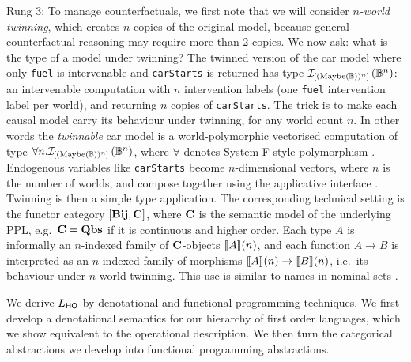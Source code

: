 \documentclass[11pt,a4paper]{article}
\begin{document}
Rung 3: To manage counterfactuals, we first note that we will consider \emph{$n$-world twinning}, which creates $n$ copies of the original model, because general counterfactual reasoning may require more than 2 copies. We now ask: what is the type of a model under twinning? The twinned version of the car model where only \texttt{fuel} is intervenable and \texttt{carStarts} is returned has type $\mathcal{I}_{[(\mathrm{Maybe}({\mathbb{B}}))^n]}\left(\mathbb{B}^n\right)$: an intervenable computation with $n$ intervention labels (one \texttt{fuel} intervention label per world), and returning $n$ copies of \texttt{carStarts}. The trick is to make each causal model carry its behaviour under twinning, for any world count $n$. In other words the \emph{twinnable} car model is a world-polymorphic vectorised computation of type $\forall n. \mathcal{I}_{[(\mathrm{Maybe}({\mathbb{B}}))^n]}\left(\mathbb{B}^n\right)$, where $\forall$ denotes System-F-style polymorphism \cite{reynolds74_system_f,Girard1972InterpretationFE}. Endogenous variables like \texttt{carStarts} become $n$-dimensional vectors, where $n$ is the number of worlds, and compose together using the applicative interface \cite{gibbons2016naperian}. Twinning is then a simple type application. The corresponding technical setting is the functor category $[\mathbf{Bij}, \mathbf{C}]$, where $\mathbf{C}$ is the semantic model of the underlying PPL, e.g.~$\mathbf{C} = \mathbf{Qbs}$ if it is continuous and higher order. Each type $A$ is informally an $n$-indexed family of $\mathbf{C}$-objects $\llbracket{A}\rrbracket(n)$, and each function $A \to B$ is interpreted as an $n$-indexed family of morphisms $\llbracket{A}\rrbracket(n) \to \llbracket{B}\rrbracket(n)$, i.e.~its behaviour under $n$-world twinning. This use is similar to names in nominal sets \cite{pitts2013nominalsets}.

We derive $L_{\mathsf{HO}}$ by denotational and functional programming techniques. We first develop a denotational semantics for our hierarchy of first order languages, which we show equivalent to the operational description. We then turn the categorical abstractions we develop into functional programming abstractions. 


\end{document}

